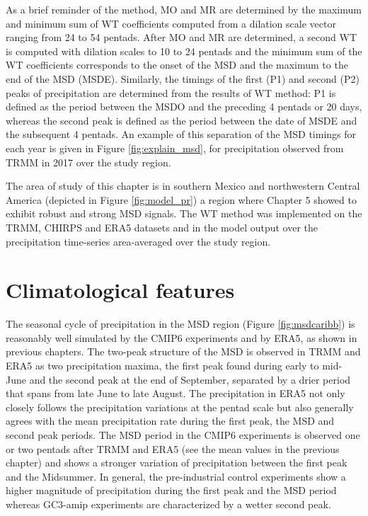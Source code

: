As a brief reminder of the method, MO and MR are determined by the maximum and minimum sum of WT coefficients computed from a dilation scale vector ranging from 24 to 54 pentads. After MO and MR are determined, a second WT is computed with dilation scales to 10 to 24 pentads and the minimum sum of the WT coefficients corresponds to the onset of the MSD and the maximum to the end of the MSD (MSDE). 
Similarly, the timings of the first (P1) and second (P2) peaks of precipitation are determined from the results of WT method: P1 is defined as the period between the MSDO and the preceding 4 pentads or 20 days, whereas the second peak is defined as the period between the date of MSDE and the subsequent 4 pentads. An example of this separation of the MSD timings for each year is given in Figure \ref{fig:explain_msd}, for precipitation observed from TRMM in 2017 over the study region.

The area of study of this chapter is in southern Mexico and northwestern Central America (depicted in Figure \ref{fig:model_pr}) a region where Chapter 5 showed to exhibit robust and strong MSD signals. The WT method was implemented on the TRMM, CHIRPS and ERA5 datasets and in the model output over the precipitation time-series area-averaged over the study region. 


\section{Climatological features}

\label{sq:msdclim}



The seasonal cycle of precipitation in the MSD region (Figure \ref{fig:msdcaribb}) is reasonably well simulated by the CMIP6 experiments and by ERA5, as shown in previous chapters.
The two-peak structure of the MSD is observed in TRMM and ERA5 as two precipitation maxima, the first peak found during early to mid-June and the second peak at the end of September, separated by a drier period that spans from late June to late August. The precipitation in ERA5 not only closely follows the precipitation variations at the pentad scale but also generally agrees with the mean precipitation rate during the first peak, the MSD and second peak periods.
The MSD period in the CMIP6 experiments is observed one or two pentads after TRMM and ERA5 (see the mean values in the previous chapter) and shows a stronger variation of precipitation between the first peak and the Midsummer. 
In general, the pre-industrial control experiments show a higher magnitude of precipitation during the first peak and the MSD period whereas GC3-amip experiments are characterized by a wetter second peak. 

